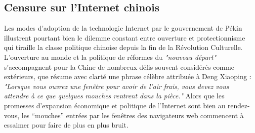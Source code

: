 \subsection[Censure sur l’Internet chinois]{Censure sur l’Internet chinois}
Les modes d’adoption de la technologie Internet par le gouvernement de Pékin illustrent pourtant bien le dilemme constant entre ouverture et protectionnisme qui tiraille la classe politique chinoise depuis la fin de la Révolution Culturelle. L’ouverture au monde et la politique de réformes du \textit{"nouveau départ"} s’accompagnent pour la Chine de nombreux défis souvent considérés comme extérieurs, que résume avec clarté une phrase célèbre attribuée à Deng Xiaoping : \textit{"Lorsque vous ouvrez une fenêtre pour avoir de l’air frais, vous devez vous attendre à ce que quelques mouches rentrent dans la pièce."} Alors que les promesses d’expansion économique et politique de l’Internet sont bien au rendez-vous, les “mouches” entrées par les fenêtres des navigateurs web commencent à essaimer pour faire de plus en plus bruit. 

